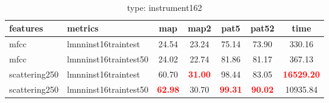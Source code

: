  
\begin{table} 
\begin{center} 
\ 
 \setlength{\tabcolsep}{.16667em} 
\begin{tabular}{llccccc} 
features & metrics & map & map2 & pat5 & pat52 & time \\ 
\hline 
mfcc & lmnninst16traintest & 24.54 & 23.24 & 75.14 & 73.90 &   330.16 \\ 
mfcc & lmnninst16traintest50 & 24.02 & 22.74 & 81.86 & 81.17 &   367.13 \\ 
scattering250 & lmnninst16traintest & 60.70 & \textbf{\textcolor{red}{31.00}} & 98.44 & 83.05 & \textbf{\textcolor{red}{16529.20}} \\ 
scattering250 & lmnninst16traintest50 & \textbf{\textcolor{red}{62.98}} & 30.70 & \textbf{\textcolor{red}{99.31}} & \textbf{\textcolor{red}{90.02}} & 10935.84 \\ 
\end{tabular} 
\end{center} 
\caption{type: instrument162} 
\label{tyinstrument162} 
\end{table} 
 
